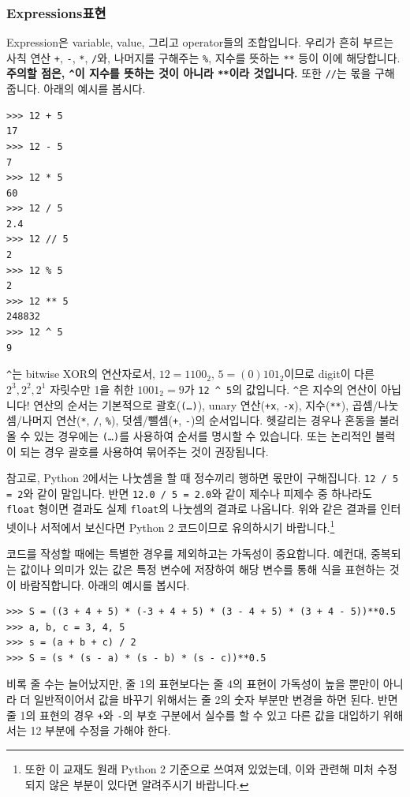 \documentclass[../main.tex]{subfiles}
\begin{document}
\subsubsection{Expressions표현}
Expression은 variable, value, 그리고 operator들의 조합입니다.
우리가 흔히 부르는 사칙 연산 \texttt{+}, \texttt{-}, \texttt{*}, \texttt{/}와, 나머지를 구해주는 \texttt{\%}, 지수를 뜻하는 \texttt{**} 등이 이에 해당합니다.
\textbf{주의할 점은, \texttt{\^{}}이 지수를 뜻하는 것이 아니라 \texttt{**}이라 것입니다.}
또한 \texttt{//}는 몫을 구해줍니다.
아래의 예시를 봅시다.
\begin{verbatim}
>>> 12 + 5
17
>>> 12 - 5
7
>>> 12 * 5
60
>>> 12 / 5
2.4
>>> 12 // 5
2
>>> 12 % 5
2
>>> 12 ** 5
248832
>>> 12 ^ 5
9
\end{verbatim}
\texttt{\^{}}는 bitwise XOR의 연산자로서, $12 = 1100_2$, $5 = (0)101_2$이므로 digit이 다른 $2^3, 2^2, 2^1$ 자릿수만 1을 취한 $1001_2 = 9$가 \texttt{12 \^{} 5}의 값입니다.
\texttt{\^{}}은 지수의 연산이 아닙니다!
연산의 순서는 기본적으로 괄호(\texttt{(\dots)}), unary 연산(\texttt{+x}, \texttt{-x}), 지수(\texttt{**}), 곱셈/나눗셈/나머지 연산(\texttt{*}, \texttt{/}, \texttt{\%}), 덧셈/뺄셈(\texttt{+}, \texttt{-})의 순서입니다.
헷갈리는 경우나 혼동을 불러올 수 있는 경우에는 \texttt{(\dots)}를 사용하여 순서를 명시할 수 있습니다.
또는 논리적인 블럭이 되는 경우 괄호를 사용하여 묶어주는 것이 권장됩니다.

참고로, Python 2에서는 나눗셈을 할 때 정수끼리 행하면 몫만이 구해집니다.
\texttt{12 / 5 = 2}와 같이 말입니다.
반면 \texttt{12.0 / 5 = 2.0}와 같이 제수나 피제수 중 하나라도 \texttt{float} 형이면 결과도 실제 \texttt{float}의 나눗셈의 결과로 나옵니다.
위와 같은 결과를 인터넷이나 서적에서 보신다면 Python 2 코드이므로 유의하시기 바랍니다.\footnote{또한 이 교재도 원래 Python 2 기준으로 쓰여져 있었는데, 이와 관련해 미처 수정되지 않은 부분이 있다면 알려주시기 바랍니다.}

코드를 작성할 때에는 특별한 경우를 제외하고는 가독성이 중요합니다.
예컨대, 중복되는 값이나 의미가 있는 값은 특정 변수에 저장하여 해당 변수를 통해 식을 표현하는 것이 바람직합니다.
아래의 예시를 봅시다.
\begin{verbatim}
>>> S = ((3 + 4 + 5) * (-3 + 4 + 5) * (3 - 4 + 5) * (3 + 4 - 5))**0.5
>>> a, b, c = 3, 4, 5
>>> s = (a + b + c) / 2
>>> S = (s * (s - a) * (s - b) * (s - c))**0.5
\end{verbatim}
비록 줄 수는 늘어났지만, 줄 1의 표현보다는 줄 4의 표현이 가독성이 높을 뿐만이 아니라 더 일반적이어서 값을 바꾸기 위해서는 줄 2의 숫자 부분만 변경을 하면 된다.
반면 줄 1의 표현의 경우 \texttt{+}와 \texttt{-}의 부호 구분에서 실수를 할 수 있고 다른 값을 대입하기 위해서는 12 부분에 수정을 가해야 한다.
\end{document}

